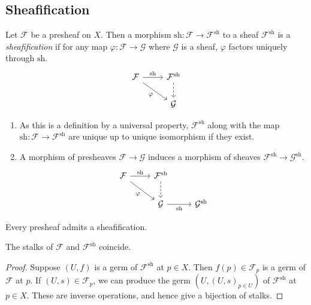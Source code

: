 \subsection{Sheafification}
\begin{definition}
    Let \( \mathcal F \) be a presheaf on \( X \).
    Then a morphism \( \mathrm{sh} : \mathcal F \to \mathcal F^{\mathrm{sh}} \) to a sheaf \( \mathcal F^{\mathrm{sh}} \) is a \emph{sheafification} if for any map \( \varphi : \mathcal F \to \mathcal G \) where \( \mathcal G \) is a sheaf, \( \varphi \) factors uniquely through \( \mathrm{sh} \).
    \[\begin{tikzcd}
        {\mathcal F} & {\mathcal F^{\mathrm{sh}}} \\
        & {\mathcal G}
        \arrow["{\mathrm{sh}}", from=1-1, to=1-2]
        \arrow[dashed, from=1-2, to=2-2]
        \arrow["\varphi"', from=1-1, to=2-2]
    \end{tikzcd}\]
\end{definition}
\begin{remark}
    \begin{enumerate}
        \item As this is a definition by a universal property, \( \mathcal F^{\mathrm{sh}} \) along with the map \( \mathrm{sh} : \mathcal F \to \mathcal F^{\mathrm{sh}} \) are unique up to unique isomorphism if they exist.
        \item A morphism of presheaves \( \mathcal F \to \mathcal G \) induces a morphism of sheaves \( \mathcal F^{\mathrm{sh}} \to \mathcal G^{\mathrm{sh}} \).
        \[\begin{tikzcd}
            {\mathcal F} & {\mathcal F^{\mathrm{sh}}} \\
            & {\mathcal G} & {\mathcal G^{\mathrm{sh}}}
            \arrow["{\mathrm{sh}}", from=1-1, to=1-2]
            \arrow[dashed, from=1-2, to=2-2]
            \arrow["\varphi"', from=1-1, to=2-2]
            \arrow["{\mathrm{sh}}"', from=2-2, to=2-3]
        \end{tikzcd}\]
    \end{enumerate}
\end{remark}
\begin{proposition}
    Every presheaf admits a sheafification.
\end{proposition}
\begin{corollary}
    The stalks of \( \mathcal F \) and \( \mathcal F^{\mathrm{sh}} \) coincide.
\end{corollary}
\begin{proof}
    Suppose \( (U, f) \) is a germ of \( \mathcal F^{\mathrm{sh}} \) at \( p \in X \).
    Then \( f(p) \in \mathcal F_p \) is a germ of \( \mathcal F \) at \( p \).
    If \( (U, s) \in \mathcal F_p \), we can produce the germ \( (U, (U, s)_{p \in U}) \) of \( \mathcal F^{\mathrm{sh}} \) at \( p \in X \).
    These are inverse operations, and hence give a bijection of stalks.
\end{proof}

